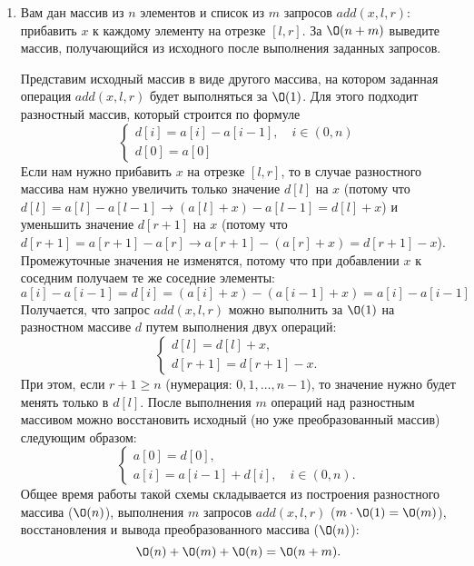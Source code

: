 \begin{enumerate}
  \item
    Вам дан массив из $n$ элементов и
    список из $m$ запросов $add(x, l, r)$: прибавить $x$ к каждому
    элементу на отрезке $[l, r]$. За $\O(n + m)$ выведите массив,
    получающийся из исходного после выполнения заданных запросов.
    \begin{solution}
      Представим исходный массив в виде другого массива, на котором заданная операция $add(x, l, r)$ будет выполняться за $\O(1)$. Для этого подходит разностный массив, который строится по формуле
      \begin{equation}
        \begin{cases}
          d[i] = a[i] - a[i-1], \quad i \in (0, n) \\
          d[0] = a[0]
        \end{cases}
      \end{equation}
      Если нам нужно прибавить $x$ на отрезке $[l, r]$, то в случае разностного массива нам нужно увеличить только значение $d[l]$ на $x$ (потому что $d[l] = a[l] - a[l-1] \to (a[l] + x) - a[l-1] = d[l] + x$) и уменьшить значение $d[r+1]$ на $x$ (потому что $d[r+1] = a[r+1] - a[r] \to a[r+1] - (a[r] + x) = d[r+1] - x$). Промежуточные значения не изменятся, потому что при добавлении $x$ к соседним получаем те же соседние элементы:
      \begin{equation}
          a[i] - a[i-1] = d[i] = (a[i] + x)  - (a[i-1] + x) = a[i] - a[i-1]
      \end{equation}
      Получается, что запрос $add(x, l, r)$ можно выполнить за $\O(1)$ на разностном массиве $d$ путем выполнения двух операций:
      \begin{equation}
        \begin{cases}
          d[l] = d[l] + x, \\
          d[r+1] = d[r+1] - x.
        \end{cases}
      \end{equation}
      При этом, если $r+1 \geq n$ (нумерация: $0,1,\ldots,n-1$), то значение нужно будет менять только в $d[l]$.
      После выполнения $m$ операций над разностным массивом можно восстановить исходный (но уже преобразованный массив) следующим образом:
      \begin{equation}
        \begin{cases}
          a[0] = d[0], \\
          a[i] = a[i-1] + d[i],\quad i \in (0, n).
        \end{cases}
      \end{equation}
      Общее время работы такой схемы складывается из построения разностного массива ($\O(n)$), выполнения $m$ запросов $add(x, l, r)$ ($m\cdot\O(1) = \O(m)$), восстановления и вывода преобразованного массива ($\O(n)$):
      \begin{equation}
        \O(n) + \O(m) + \O(n) = \O(n+m).
      \end{equation}
    \end{solution}


\end{enumerate}
